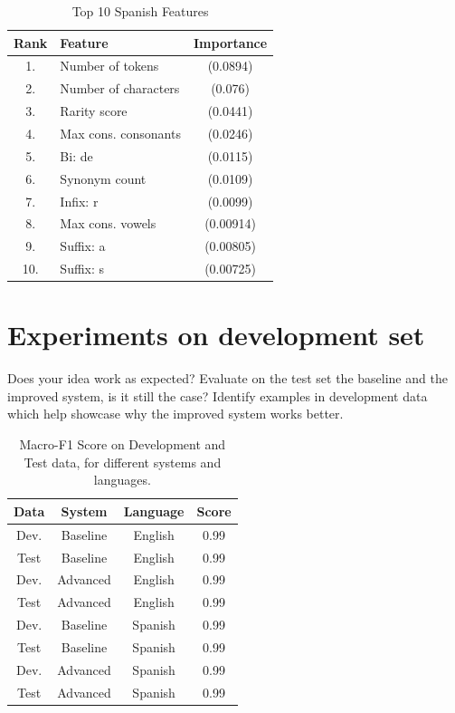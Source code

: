 \documentclass[11pt,a4paper]{article}
\begin{document}
\begin{table}[h]
\begin{center}
\begin{tabular}{|c|l|c|}
\hline
\textbf{Rank} & \textbf{Feature} & \textbf{Importance} \\
\hline
1. & Number of tokens & (0.0894) \\ \hline
2. & Number of characters & (0.076) \\ \hline
3. & Rarity score & (0.0441) \\ \hline
4. & Max cons. consonants & (0.0246) \\ \hline
5. & Bi: de & (0.0115) \\ \hline
6. & Synonym count & (0.0109) \\ \hline
7. & Infix: r & (0.0099) \\ \hline
8. & Max cons. vowels & (0.00914) \\ \hline
9. & Suffix: a & (0.00805) \\ \hline
10. & Suffix: s & (0.00725) \\ \hline
\end{tabular}
\caption{Top 10 Spanish Features}
\label{tab:EngFeats}
\end{center}
\end{table}



\section{Experiments on development set}

Does your idea work as expected? Evaluate on the test set the baseline and the improved system, is it still the case? Identify examples in development data which help showcase why the improved system works better.

\begin{table}[h]
\begin{center}
\begin{tabular}{|c|c|c|c|}
\hline
\textbf{Data} & \textbf{System} & \textbf{Language} & \textbf{Score} \\
\hline \hline
Dev. & Baseline & English & 0.99 \\ \hline
Test & Baseline & English & 0.99 \\ \hline \hline
Dev. & Advanced & English & 0.99 \\ \hline
Test & Advanced & English & 0.99 \\ \hline \hline
Dev. & Baseline & Spanish & 0.99 \\ \hline
Test & Baseline & Spanish & 0.99 \\ \hline \hline
Dev. & Advanced & Spanish & 0.99 \\ \hline
Test & Advanced & Spanish & 0.99 \\ \hline
\end{tabular}
\caption{Macro-F1 Score on Development and Test data, for different systems and languages.}
\label{tab:testdev}
\end{center}
\end{table}
\end{document}
